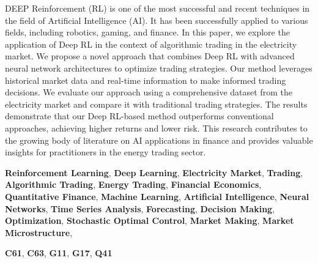 DEEP Reinforcement (RL) is one of the most successful and recent
techniques in the field of Artificial Intelligence (AI). It has been
successfully applied to various fields, including robotics, gaming,
and finance. In this paper, we explore the application of Deep RL in
the context of algorithmic trading in the electricity market. We
propose a novel approach that combines Deep RL with advanced neural
network architectures to optimize trading strategies. Our method
leverages historical market data and real-time information to make
informed trading decisions. We evaluate our approach using a
comprehensive dataset from the electricity market and compare it with
traditional trading strategies. The results demonstrate that our Deep
RL-based method outperforms conventional approaches, achieving higher
returns and lower risk. This research contributes to the growing body
of literature on AI applications in finance and provides valuable
insights for practitioners in the energy trading sector.

\begin{keywords}
    \textbf{Reinforcement Learning}, \textbf{Deep Learning},
    \textbf{Electricity Market}, \textbf{Trading},
    \textbf{Algorithmic Trading}, \textbf{Energy Trading},
    \textbf{Financial Economics}, \textbf{Quantitative Finance},
    \textbf{Machine Learning}, \textbf{Artificial Intelligence},
    \textbf{Neural Networks}, \textbf{Time Series Analysis},
    \textbf{Forecasting}, \textbf{Decision Making},
    \textbf{Optimization}, \textbf{Stochastic Optimal Control},
    \textbf{Market Making}, \textbf{Market Microstructure},
\end{keywords}

\begin{classification}
    \textbf{C61}, \textbf{C63}, \textbf{G11}, \textbf{G17}, \textbf{Q41}
\end{classification}
\clearpage